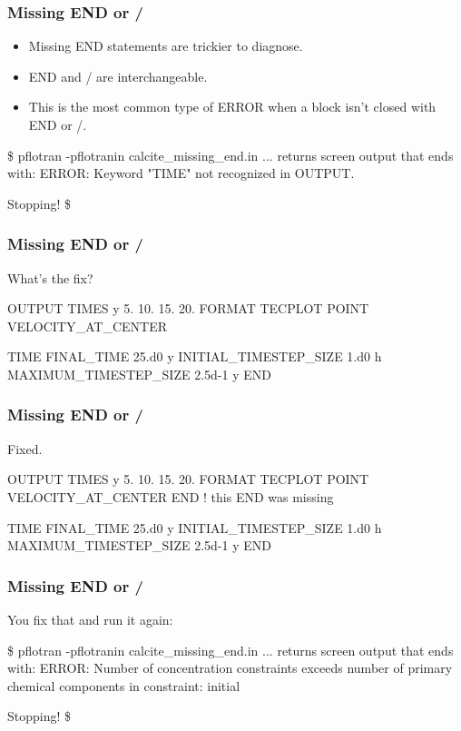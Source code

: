 \documentclass{beamer}
\newcommand\gehcomment[1]{{{\color{orange} #1}}}
\newcommand\redcomment[1]{{{\color{red} #1}}}
\newcommand\bluecomment[1]{{{\color{blue} #1}}}
\newcommand\greencomment[1]{{{\color{green} #1}}}
\begin{document}
\begin{frame}\frametitle{Missing \greencomment{END} or \greencomment{/}}
\begin{itemize}
\item Missing \greencomment{END} statements are trickier to diagnose.
\item \greencomment{END} and \greencomment{/} are interchangeable.
\item This is the most common type of ERROR when a block isn't closed with \greencomment{END} or \greencomment{/}.
\end{itemize}
\begin{semiverbatim}

\$ pflotran -pflotranin calcite_missing_end.in
... \gehcomment{returns screen output that ends with:}
  ERROR:  Keyword "TIME" not recognized in OUTPUT.

  Stopping!
\$
\end{semiverbatim}

\end{frame}

\begin{frame}\frametitle{Missing \greencomment{END} or \greencomment{/}}
\redcomment{What's the fix?}
\begin{semiverbatim}

OUTPUT
  TIMES y 5. 10. 15. 20.
  FORMAT TECPLOT POINT
  VELOCITY_AT_CENTER

TIME
  FINAL_TIME 25.d0 y
  INITIAL_TIMESTEP_SIZE 1.d0 h
  MAXIMUM_TIMESTEP_SIZE 2.5d-1 y
END
\end{semiverbatim}

\end{frame}

\begin{frame}\frametitle{Missing \greencomment{END} or \greencomment{/}}
\redcomment{Fixed.}
\begin{semiverbatim}

OUTPUT
  TIMES y 5. 10. 15. 20.
  FORMAT TECPLOT POINT
  VELOCITY_AT_CENTER
END \bluecomment{! this \greencomment{END} was missing}

TIME
  FINAL_TIME 25.d0 y
  INITIAL_TIMESTEP_SIZE 1.d0 h
  MAXIMUM_TIMESTEP_SIZE 2.5d-1 y
END
\end{semiverbatim}

\end{frame}

\begin{frame}\frametitle{Missing \greencomment{END} or \greencomment{/}}
\redcomment{You fix that and run it again:}
\begin{semiverbatim}

\$ pflotran -pflotranin calcite_missing_end.in
... \gehcomment{returns screen output that ends with:}
  ERROR: Number of concentration constraints exceeds 
  number of primary chemical components in constraint:
  initial

  Stopping!
\$
\end{semiverbatim}

\end{frame}
\end{document}
